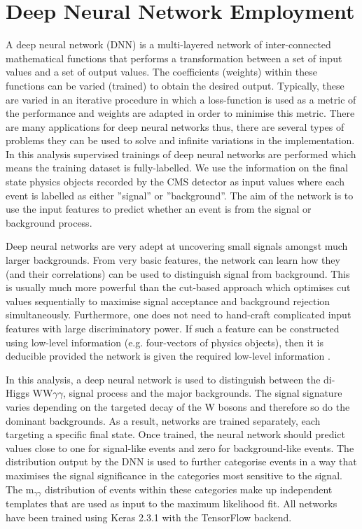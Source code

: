 \chapter{Deep Neural Network Employment}
\label{sec:DNN}

A deep neural network (DNN) is a multi-layered network of inter-connected mathematical functions that performs a transformation between a set of input values and a set of output values.
The coefficients (weights) within these functions can be varied (trained) to obtain the desired output. Typically, these are varied in an iterative procedure in 
which a loss-function is used as a metric of the performance and weights are adapted in order to minimise this metric. There are many applications for deep neural networks thus, there are 
several types of problems they can be used to solve and infinite variations in the implementation. In this analysis supervised trainings of deep neural networks are performed 
which means the training dataset is fully-labelled. We use the information on the final state physics objects recorded by the CMS detector as input values where 
each event is labelled as either ''signal'' or ''background''. The aim of the network is to use the input features to predict whether an event is from the signal or background process.

Deep neural networks are very adept at uncovering small signals amongst much larger backgrounds. From very basic features, the network can learn how they (and their correlations) can be used to distinguish signal from background. This is usually much more powerful than the cut-based approach which
optimises cut values sequentially to maximise signal acceptance and background rejection simultaneously. Furthermore, one does not need to hand-craft 
complicated input features with large discriminatory power. If such a feature can be constructed using low-level information (e.g. four-vectors of physics objects), 
then it is deducible provided the network is given the required low-level information \cite{whiteson_DNN}.

In this analysis, a deep neural network is used to distinguish between the di-Higgs WW$\gamma\gamma$, signal process and the major backgrounds. 
The signal signature varies depending on the targeted decay of the W bosons and therefore so do the dominant backgrounds. 
As a result, networks are trained separately, each targeting a specific final state. Once trained, the neural network should predict values close to one for signal-like events
and zero for background-like events. The distribution output by the DNN is used to further categorise events in a way that maximises the signal significance 
in the categories most sensitive to the signal. The m$_{\gamma\gamma}$ distribution of events within these categories make up independent templates that
are used as input to the maximum likelihood fit. All networks have been trained using Keras 2.3.1 with the TensorFlow backend.